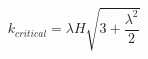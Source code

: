 \begin{equation}\label{conditionus}
k_{critical}=\lambda H\sqrt{3+\frac{\lambda^2}{2}}
\end{equation}

